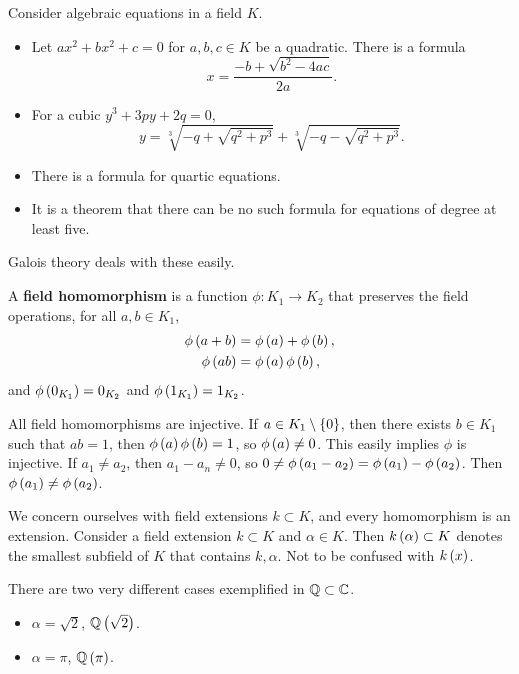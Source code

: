 \begin{example*}
Consider algebraic equations in a field $ K $.
\begin{itemize}
\item Let $ ax^2 + bx^2 + c = 0 $ for $ a, b, c \in K $ be a quadratic. There is a formula
$$ x = \dfrac{-b + \sqrt{b^2 - 4ac}}{2a}. $$
\item For a cubic $ y^3 + 3py + 2q = 0 $,
$$ y = \sqrt[3]{-q + \sqrt{q^2 + p^3}} + \sqrt[3]{-q - \sqrt{q^2 + p^3}}. $$
\item There is a formula for quartic equations.
\item It is a theorem that there can be no such formula for equations of degree at least five.
\end{itemize}
Galois theory deals with these easily.
\end{example*}

\pagebreak


\begin{definition}
A \textbf{field homomorphism} is a function $ \phi : K_1 \to K_2 $ that preserves the field operations, for all $ a, b \in K_1 $,
\begin{align*}
\phi\left( a + b \right) & = \phi\left( a \right) + \phi\left( b \right), \\
\phi\left( ab \right) & = \phi\left( a \right)\phi\left( b \right),
\end{align*}
and $ \phi\left( 0_{K_1} \right) = 0_{K_2} $ and $ \phi\left( 1_{K_1} \right) = 1_{K_2} $.
\end{definition}

\begin{remark*}
All field homomorphisms are injective. If $ a \in K_1 \setminus \left\{ 0 \right\} $, then there exists $ b \in K_1 $ such that $ ab = 1 $, then $ \phi\left( a \right)\phi\left( b \right) = 1 $, so $ \phi\left( a \right) \ne 0 $. This easily implies $ \phi $ is injective. If $ a_1 \ne a_2 $, then $ a_1 - a_n \ne 0 $, so $ 0 \ne \phi\left( a_1 - a_2 \right) = \phi\left( a_1 \right) - \phi\left( a_2 \right) $. Then $ \phi\left( a_1 \right) \ne \phi\left( a_2 \right) $.
\end{remark*}

We concern ourselves with field extensions $ k \subset K $, and every homomorphism is an extension. Consider a field extension $ k \subset K $ and $ \alpha \in K $. Then $ k\left( \alpha \right) \subset K $ denotes the smallest subfield of $ K $ that contains $ k, \alpha $. Not to be confused with $ k\left( x \right) $.

\begin{example*}
There are two very different cases exemplified in $ \mathbb{Q} \subset \mathbb{C} $.
\begin{itemize}
\item $ \alpha = \sqrt{2} $, $ \mathbb{Q}\left( \sqrt{2} \right) $.
\item $ \alpha = \pi $, $ \mathbb{Q}\left( \pi \right) $.
\end{itemize}
\end{example*}

